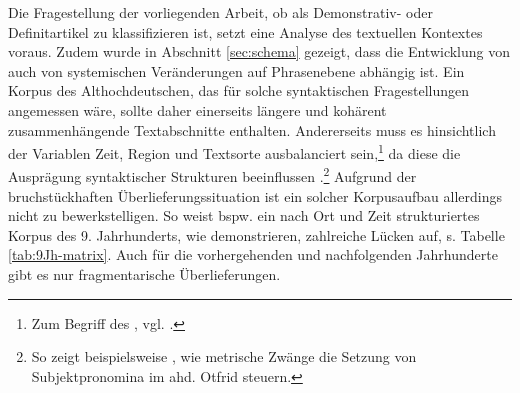 Die Fragestellung der vorliegenden Arbeit, ob  als Demonstrativ- oder Definitartikel zu klassifizieren ist, setzt eine Analyse des textuellen Kontextes voraus. Zudem wurde in Abschnitt \ref{sec:schema} gezeigt, dass die Entwicklung von  auch von systemischen Veränderungen auf Phrasenebene abhängig ist. Ein Korpus des Althochdeutschen, das für solche syntaktischen Fragestellungen angemessen wäre, sollte daher einerseits längere und kohärent zusammenhängende Textabschnitte enthalten. Andererseits muss es hinsichtlich der Variablen Zeit, Region und Textsorte ausbalanciert sein,\footnote{Zum Begriff des , vgl. \cite[6]{Atkins1992}.} da diese die Ausprägung syntaktischer Strukturen beeinflussen \parencite[74]{Fleischer2011}.\footnote{So zeigt beispielsweise \textcite[47]{Eggenberger1961}, wie metrische Zwänge die Setzung von Subjektpronomina im ahd. Otfrid steuern.} Aufgrund der bruchstückhaften Überlieferungssituation ist ein solcher Korpusaufbau allerdings nicht zu bewerkstelligen. So weist bspw. ein nach Ort und Zeit strukturiertes Korpus des 9. Jahrhunderts, wie \textcite{Fleischer2011} demonstrieren, zahlreiche Lücken auf,  s. Tabelle \ref{tab:9Jh-matrix}. Auch für die vorhergehenden und nachfolgenden Jahrhunderte gibt es nur fragmentarische Überlieferungen.

\begin{table}
\caption{Strukturiertes Korpus des 9. Jh. \parencite[75]{Fleischer2011} (T = Tatian, O = Otfrid, MF = Monseer Fragmente)\label{tab:9Jh-matrix}}
\end{table}  

